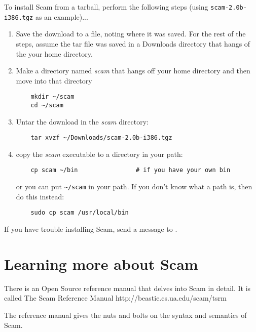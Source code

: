 \documentclass{article}
\begin{document}
To install Scam from a tarball, perform the following steps
(using {\tt scam-2.0b-i386.tgz} as an example)...

\begin{enumerate}

\item
    Save the download to a file, noting where it was saved. For the rest 
    of the steps, assume the tar file was saved in a Downloads directory
    that hangs of the your home directory.
\item
    Make a directory named {\it scam} that hangs off your home directory
    and then move into that directory


\begin{verbatim}
    mkdir ~/scam
    cd ~/scam
\end{verbatim}

\item
    Untar the download in the {\it scam} directory:

\begin{verbatim}
    tar xvzf ~/Downloads/scam-2.0b-i386.tgz
\end{verbatim}

\item
    copy the {\it scam} executable to a directory in your path:

\begin{verbatim}
    cp scam ~/bin                # if you have your own bin
\end{verbatim}

or you can put \verb!~/scam! in your path.
If you don't know what a path is, then do this instead:

\begin{verbatim}
    sudo cp scam /usr/local/bin
\end{verbatim}

\end{enumerate}


If you have trouble installing Scam, send a message to 
.

\section*{Learning more about Scam}

There is an Open Source
reference manual that delves into Scam in detail.
It is called 
\xlink
    {The Scam Reference Manual}
    {http://beastie.cs.ua.edu/scam/tsrm}

The reference manual gives the nuts and bolts on the syntax
and semantics of Scam.
\end{document}
